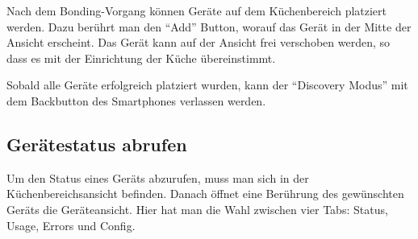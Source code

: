 Nach dem Bonding-Vorgang können Geräte auf dem Küchenbereich platziert werden. Dazu berührt man den \enquote{Add} Button, worauf das Gerät in der Mitte der Ansicht erscheint. Das Gerät kann auf der Ansicht frei verschoben werden, so dass es mit der Einrichtung der Küche übereinstimmt. 

Sobald alle Geräte erfolgreich platziert wurden, kann der \enquote{Discovery Modus} mit dem Backbutton des Smartphones verlassen werden.

\WFclear
\subsection{Gerätestatus abrufen}
Um den Status eines Geräts abzurufen, muss man sich in der Küchenbereichsansicht befinden. Danach öffnet eine Berührung des gewünschten Geräts die Geräteansicht. Hier hat man die Wahl zwischen vier Tabs: Status, Usage, Errors und Config.


